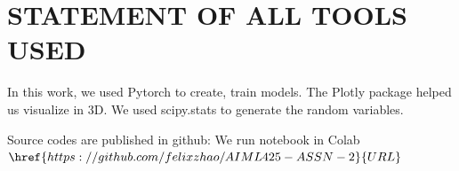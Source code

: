 \documentclass{article}
\begin{document}
\section{STATEMENT OF ALL TOOLS USED}
\label{sec:statementofalltoolsused}

In this work, we used Pytorch to create, train models. 
The Plotly package helped us visualize in 3D. 
We used scipy.stats to generate the random variables.

Source codes are published in github: 
We run notebook in Colab $\href{https://github.com/felixzhao/AIML425-ASSN-2}{URL}$




\vfill\pagebreak



\end{document}
